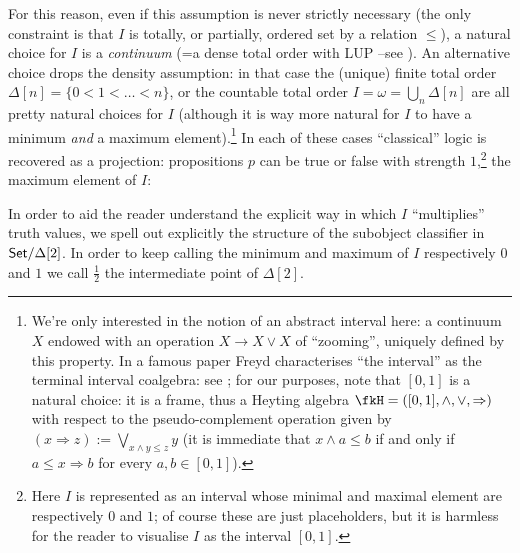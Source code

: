 For this reason, even if this assumption is never strictly necessary (the only constraint is that $I$ is totally, or partially, ordered set by a relation $\le$), a natural choice for $I$ is a \emph{continuum} (=a dense total order with LUP --see \cite{moschovakis2009descriptive}). An alternative choice drops the density assumption: in that case the (unique) finite total order $\Delta[n] = \{0 < 1 <\dots < n\}$, or the countable total order $I=\omega = \bigcup_n \Delta[n]$ are all pretty natural choices for $I$ (although it is way more natural for $I$ to have a minimum \emph{and} a maximum element).\footnote{We're only interested in the notion of an abstract interval here: a continuum $X$ endowed with an operation $X \to X \vee X$ of ``zooming'', uniquely defined by this property. In a famous paper Freyd characterises ``the interval'' as the terminal interval coalgebra: see \cite[§1]{freyd2008algebraic}; for our purposes, note that $[0,1]$ is a natural choice: it is a frame, thus a Heyting algebra $\fkH =([0,1],\land,\lor,\Rightarrow)$ with respect to the pseudo-complement operation given by $(x \Rightarrow z) := \bigvee_{x\land y \le z} y$ (it is immediate that $x \land a \le b$ if and only if $a \le x \Rightarrow b$ for every $a,b\in [0,1]$).} In each of these cases ``classical'' logic is recovered as a projection: propositions $p$ can be true or false with strength $1$,\footnote{Here $I$ is represented as an interval whose minimal and maximal element are respectively $0$ and $1$; of course these are just placeholders, but it is harmless for the reader to visualise $I$ as the interval $[0,1]$.} the maximum element of $I$:
\begin{center}
\end{center}
In order to aid the reader understand the explicit way in which $I$ ``multiplies'' truth values, we spell out explicitly the structure of the subobject classifier in $\mathsf{Set}/\Delta[2]$. In order to keep calling the minimum and maximum of $I$ respectively $0$ and $1$ we call $\frac{1}{2}$ the intermediate point of $\Delta[2]$.
